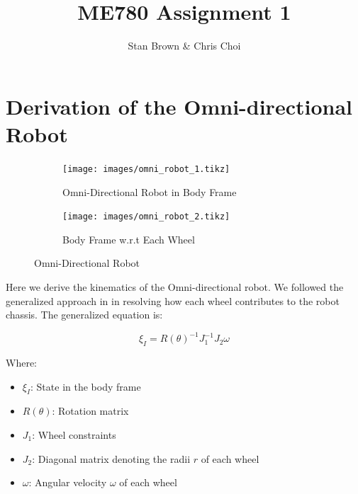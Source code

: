 \documentclass{article}
\begin{document}
\title{ME780 Assignment 1}
\author{Stan Brown \& Chris Choi}
\date{}
\maketitle



\section{Derivation of the Omni-directional Robot}
\label{sec:motion_model_derivation}

\begin{figure}[H]
	\centering
	\begin{subfigure}[b]{0.45\linewidth}
		\texttt{[image: images/omni\_robot\_1.tikz]}
		\caption{Omni-Directional Robot in Body Frame}
	\end{subfigure}
	\begin{subfigure}[b]{0.45\linewidth}
		\texttt{[image: images/omni\_robot\_2.tikz]}
		\caption{Body Frame w.r.t Each Wheel}
	\end{subfigure}
	\caption{Omni-Directional Robot}
	\label{fig:omni_robot}
\end{figure}


Here we derive the kinematics of the Omni-directional robot. We followed the
generalized approach in \cite{Siegwart04} in resolving how each wheel
contributes to the robot chassis. The generalized equation is:

\begin{equation}
	\label{eq:general_robot_kinematics_equation}
    \xi_{I} = R(\theta)^{-1} J_{1}^{-1} J_{2} \omega
\end{equation}

Where:

\begin{itemize}
	\vspace{-0.4cm}
	\setlength{\itemsep}{0pt}
	\setlength{\parskip}{0pt}
	\setlength{\parsep}{0pt}
	
    \item{$\xi_{I}$: State in the body frame}
    \item{$R(\theta)$: Rotation matrix}
    \item{$J_{1}$: Wheel constraints}
    \item{$J_{2}$: Diagonal matrix denoting the radii $r$ of each wheel}
    \item{$\omega$: Angular velocity $\omega$ of each wheel}
\end{itemize}
\end{document}
